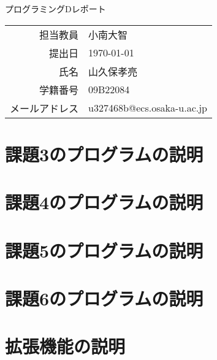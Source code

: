 \documentclass[dvipdfmx]{jarticle}
\begin{document}
\begin{titlepage}
    \begin{center}
        \vspace*{60pt}
        {\LARGE プログラミングDレポート}
        \vspace*{240pt}\\
        \begin{tabular}{rl}
            担当教員 & 小南大智\\
            提出日 & \today\\
            氏名 & 山久保孝亮\\
            学籍番号 & 09B22084\\
            メールアドレス & u327468b@ecs.osaka-u.ac.jp
        \end{tabular}
    \end{center}
\end{titlepage}

\section{課題3のプログラムの説明}

\section{課題4のプログラムの説明}

\section{課題5のプログラムの説明}

\section{課題6のプログラムの説明}

\section{拡張機能の説明}
\end{document}
